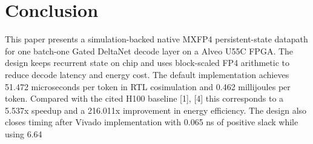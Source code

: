 ﻿\documentclass[conference]{IEEEtran}
\begin{document}
\section{Conclusion}
This paper presents a simulation-backed native MXFP4 persistent-state datapath for one batch-one Gated DeltaNet decode layer on a Alveo U55C FPGA. The design keeps recurrent state on chip and uses block-scaled FP4 arithmetic to reduce decode latency and energy cost.
The default implementation achieves 51.472 microseconds per token in RTL cosimulation and 0.462 millijoules per token. Compared with the cited H100 baseline [1], [4] this corresponds to a 5.537x speedup and a 216.011x improvement in energy efficiency. The design also closes timing after Vivado implementation with 0.065 ns of positive slack while using 6.64%
\end{document}
